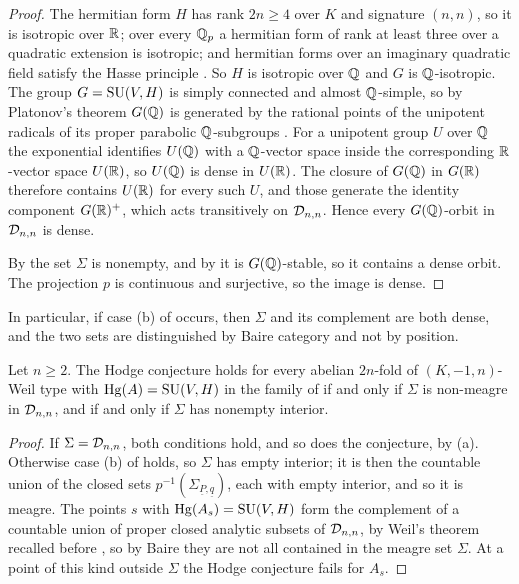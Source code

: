 \begin{proof}
The hermitian form $H$ has rank $2n\ge4$ over $K$ and signature $(n,n)$, so it
is isotropic over $\mathbb{R}$; over every $\mathbb{Q}_{p}$ a hermitian form of rank at
least three over a quadratic extension is isotropic; and hermitian forms over
an imaginary quadratic field satisfy the Hasse principle
\cite[Ch.~10, \S 6]{Sch85}. So $H$ is isotropic over $\mathbb{Q}$ and $G$ is
$\mathbb{Q}$-isotropic. The group $G=\operatorname{SU}(V,H)$ is simply connected and almost
$\mathbb{Q}$-simple, so by Platonov's theorem $G(\mathbb{Q})$ is generated by the rational
points of the unipotent radicals of its proper parabolic $\mathbb{Q}$-subgroups
\cite[Thm.~7.6 and \S 7.2]{PR94}. For a unipotent group $U$ over $\mathbb{Q}$ the
exponential identifies $U(\mathbb{Q})$ with a $\mathbb{Q}$-vector space inside the
corresponding $\mathbb{R}$-vector space $U(\mathbb{R})$, so $U(\mathbb{Q})$ is dense in $U(\mathbb{R})$.
The closure of $G(\mathbb{Q})$ in $G(\mathbb{R})$ therefore contains $U(\mathbb{R})$ for every such
$U$, and those generate the identity component $G(\mathbb{R})^{+}$, which acts
transitively on $\mathcal{D}_{n,n}$. Hence every $G(\mathbb{Q})$-orbit in $\mathcal{D}_{n,n}$ is
dense.

By  the set $\Sigma$ is nonempty, and by
 it is $G(\mathbb{Q})$-stable, so it contains a dense orbit.
The projection $p$ is continuous and surjective, so the image is dense.
\end{proof}

In particular, if case (b) of  occurs, then $\Sigma$
and its complement are both dense, and the two sets are distinguished by
Baire category and not by position.

\begin{corollary}\label{cor:meagre}
Let $n\ge2$. The Hodge conjecture holds for every abelian $2n$-fold of
$(K,-1,n)$-Weil type with $\operatorname{Hg}(A)=\operatorname{SU}(V,H)$ in the family of
 if and only if $\Sigma$ is non-meagre in $\mathcal{D}_{n,n}$, and
if and only if $\Sigma$ has nonempty interior.
\end{corollary}

\begin{proof}
If $\Sigma=\mathcal{D}_{n,n}$, both conditions hold, and so does the conjecture, by
(a). Otherwise case (b) of  holds,
so $\Sigma$ has empty interior; it is then the countable union of the closed
sets $p^{-1}(\Sigma_{\underline{P},\underline{q}})$, each with empty interior,
and so it is meagre. The points $s$ with $\operatorname{Hg}(A_{s})=\operatorname{SU}(V,H)$ form the
complement of a countable union of proper closed analytic subsets of $\mathcal{D}_{n,n}$, by
Weil's theorem \cite{Weil77} recalled before , so by Baire
they are not all contained in the meagre set $\Sigma$. At a point of this
kind outside $\Sigma$ the Hodge conjecture fails for $A_{s}$.
\end{proof}

